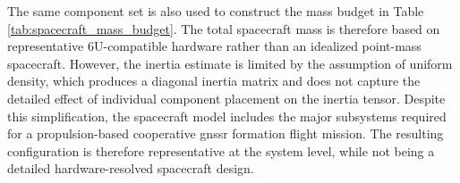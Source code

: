 The same component set is also used to construct the mass budget in Table \ref{tab:spacecraft_mass_budget}. The total spacecraft mass is therefore based on representative 6U-compatible hardware rather than an idealized point-mass spacecraft. However, the inertia estimate is limited by the assumption of uniform density, which produces a diagonal inertia matrix and does not capture the detailed effect of individual component placement on the inertia tensor. Despite this simplification, the spacecraft model includes the major subsystems required for a propulsion-based cooperative \gls{gnssr} formation flight mission. The resulting configuration is therefore representative at the system level, while not being a detailed hardware-resolved spacecraft design.

